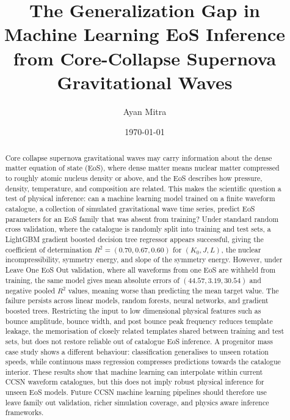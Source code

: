 \documentclass[reprint,aps,prd,floatfix,nofootinbib,superscriptaddress,showpacs]{revtex4-2}
\begin{document}
\title{The Generalization Gap in Machine Learning EoS Inference from Core-Collapse Supernova Gravitational Waves}

\author{Ayan Mitra}

\date{\today}

\begin{abstract}
Core collapse supernova gravitational waves may carry information about the dense matter equation of state (EoS), where dense matter means nuclear matter compressed to roughly atomic nucleus density or above, and the EoS describes how pressure, density, temperature, and composition are related. This makes the scientific question a test of physical inference: can a machine learning model trained on a finite waveform catalogue, a collection of simulated gravitational wave time series, predict EoS parameters for an EoS family that was absent from training? Under standard random cross validation, where the catalogue is randomly split into training and test sets, a LightGBM gradient boosted decision tree regressor appears successful, giving the coefficient of determination $R^2=(0.70,0.67,0.60)$ for $(K_0,J,L)$, the nuclear incompressibility, symmetry energy, and slope of the symmetry energy. However, under Leave One EoS Out validation, where all waveforms from one EoS are withheld from training, the same model gives mean absolute errors of $(44.57,3.19,30.54)$  and negative pooled $R^2$ values, meaning worse than predicting the mean target value. The failure persists across linear models, random forests, neural networks, and gradient boosted trees. Restricting the input to low dimensional physical features such as bounce amplitude, bounce width, and post bounce peak frequency reduces template leakage, the memorisation of closely related templates shared between training and test sets, but does not restore reliable out of catalogue EoS inference. A progenitor mass case study shows a different behaviour: classification generalises to unseen rotation speeds, while continuous mass regression compresses predictions towards the catalogue interior. These results show that machine learning can interpolate within current CCSN waveform catalogues, but this does not imply robust physical inference for unseen EoS models. Future CCSN machine learning pipelines should therefore use leave family out validation, richer simulation coverage, and physics aware inference frameworks.
\end{abstract}
\end{document}
